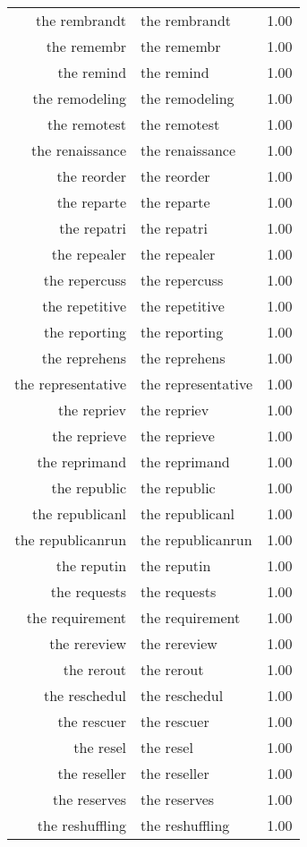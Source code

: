 \begin{table}[ht]
\begin{tabular}{rlr}
  the rembrandt & the rembrandt & 1.00 \\ 
  the remembr & the remembr & 1.00 \\ 
  the remind & the remind & 1.00 \\ 
  the remodeling & the remodeling & 1.00 \\ 
  the remotest & the remotest & 1.00 \\ 
  the renaissance & the renaissance & 1.00 \\ 
  the reorder & the reorder & 1.00 \\ 
  the reparte & the reparte & 1.00 \\ 
  the repatri & the repatri & 1.00 \\ 
  the repealer & the repealer & 1.00 \\ 
  the repercuss & the repercuss & 1.00 \\ 
  the repetitive & the repetitive & 1.00 \\ 
  the reporting & the reporting & 1.00 \\ 
  the reprehens & the reprehens & 1.00 \\ 
  the representative & the representative & 1.00 \\ 
  the repriev & the repriev & 1.00 \\ 
  the reprieve & the reprieve & 1.00 \\ 
  the reprimand & the reprimand & 1.00 \\ 
  the republic & the republic & 1.00 \\ 
  the republicanl & the republicanl & 1.00 \\ 
  the republicanrun & the republicanrun & 1.00 \\ 
  the reputin & the reputin & 1.00 \\ 
  the requests & the requests & 1.00 \\ 
  the requirement & the requirement & 1.00 \\ 
  the rereview & the rereview & 1.00 \\ 
  the rerout & the rerout & 1.00 \\ 
  the reschedul & the reschedul & 1.00 \\ 
  the rescuer & the rescuer & 1.00 \\ 
  the resel & the resel & 1.00 \\ 
  the reseller & the reseller & 1.00 \\ 
  the reserves & the reserves & 1.00 \\ 
  the reshuffling & the reshuffling & 1.00 \\ 

\end{tabular}
\end{table}
